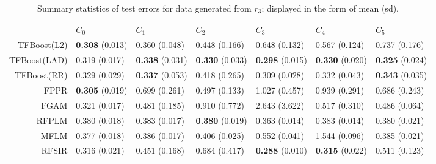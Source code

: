 \begin{table}[H]
\centering
\footnotesize
\begin{tabular}{rllllll}
  \hline
 & $C_0$ & $C_1$ & $C_2$ & $C_3$ & $C_4$ & $C_5$ \\ 
  \hline
TFBoost(L2) & \textbf{0.308} (0.013) & 0.360 (0.048) & 0.448 (0.166) & 0.648 (0.132) & 0.567 (0.124) & 0.737 (0.176) \\ 
  TFBoost(LAD) & 0.319 (0.017) & \textbf{0.338} (0.031) & \textbf{0.330} (0.033) & \textbf{0.298} (0.015) & \textbf{0.330} (0.020) & \textbf{0.325} (0.024) \\ 
  TFBoost(RR) & 0.329 (0.029) & \textbf{0.337} (0.053) & 0.418 (0.265) & 0.309 (0.028) & 0.332 (0.043) & \textbf{0.343} (0.035) \\ 
  FPPR & \textbf{0.305} (0.019) & 0.699 (0.261) & 0.497 (0.133) & 1.027 (0.457) & 0.939 (0.291) & 0.686 (0.243) \\ 
  FGAM & 0.321 (0.017) & 0.481 (0.185) & 0.910 (0.772) & 2.643 (3.622) & 0.517 (0.310) & 0.486 (0.064) \\ 
  RFPLM & 0.380 (0.018) & 0.383 (0.017) & \textbf{0.380} (0.019) & 0.363 (0.014) & 0.383 (0.014) & 0.380 (0.021) \\ 
  MFLM & 0.377 (0.018) & 0.386 (0.017) & 0.406 (0.025) & 0.552 (0.041) & 1.544 (0.096) & 0.385 (0.021) \\ 
  RFSIR & 0.316 (0.021) & 0.451 (0.168) & 0.684 (0.417) & \textbf{0.288} (0.010) & \textbf{0.315} (0.022) & 0.511 (0.123) \\ 
   \hline
\end{tabular}
\caption{Summary statistics of test errors for data generated from $r_3$; displayed in the form of mean (sd).} 
\end{table}
